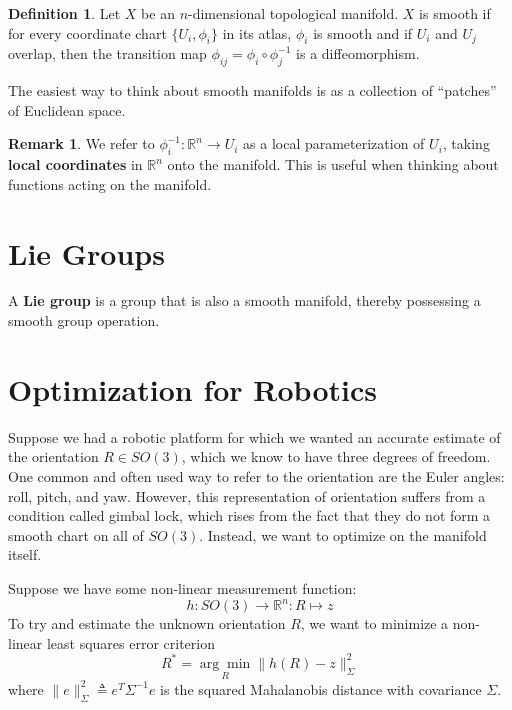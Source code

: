 \documentclass[reqno]{amsart}
\theoremstyle{definition}
\newtheorem{defn}{Definition}[section]
\newtheorem{rem}{Remark}[section]
\numberwithin{equation}{section}
\begin{document}
\begin{defn}
    Let $X$ be an $n$-dimensional topological manifold. $X$ is smooth if for every coordinate chart $\{U_i, \phi_i\}$ in its atlas, $\phi_i$ is smooth and if $U_i$ and $U_j$ overlap, then the transition map $\phi_{ij} = \phi_i \circ \phi_j^{-1}$ is a diffeomorphism.
\end{defn}

The easiest way to think about smooth manifolds is as a collection of ``patches'' of Euclidean space.

\begin{rem}
    We refer to $\phi_i^{-1}: \mathbb{R}^n \to U_i$ as a local parameterization of $U_i$, taking \textbf{local coordinates} in $\mathbb{R}^n$ onto the manifold. This is useful when thinking about functions acting on the manifold.
\end{rem}

\section{Lie Groups}

A \textbf{Lie group} is a group that is also a smooth manifold, thereby possessing a smooth group operation.

\section{Optimization for Robotics}

Suppose we had a robotic platform for which we wanted an accurate estimate of the orientation $R \in SO(3)$, which we know to have three degrees of freedom. One common and often used way to refer to the orientation are the Euler angles: roll, pitch, and yaw. However, this representation of orientation suffers from a condition called gimbal lock, which rises from the fact that they do not form a smooth chart on all of $SO(3)$. Instead, we want to optimize on the manifold itself.

Suppose we have some non-linear measurement function:
\[h: SO(3) \to \mathbb{R}^n : R \mapsto z\]
To try and estimate the unknown orientation $R$, we want to minimize a non-linear least squares error criterion
\begin{equation}\label{ObjectiveFunction}
R^* = \underset{R}{\arg\min}\|h(R) - z\|_\Sigma^2
\end{equation}
where $\|e\|_\Sigma^2 \triangleq e^T\Sigma^{-1}e$ is the squared Mahalanobis distance with covariance $\Sigma$. 
\end{document}
